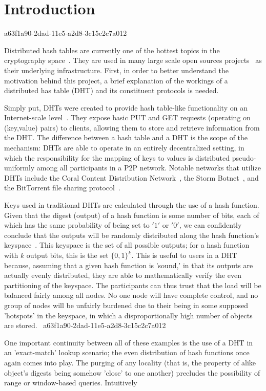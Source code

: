 \documentclass[12pt]{article}
\begin{document}
\section{Introduction}
a63f1a90-2dad-11e5-a2d8-3c15c2c7a012\par Distributed hash tables are currently one of the hottest topics in the cryptography space~\cite{Stoica:2001dj,Rowstron:2001ea,Ratnasamy:2001wn}. They are used in many large scale open sources projects~\cite{Freitas:2013tb,Xu:2010vs,Perfitt:2010fh} as their underlying infrastructure. First, in order to better understand the motivation behind this project, a brief explanation of the workings of a distributed has table (DHT) and its constituent protocols is needed.

\par Simply put, DHTs were created to provide hash table-like functionality on an Internet-scale level~\cite{Ratnasamy:2001wn}. They expose basic PUT and GET requests (operating on (key,value) pairs) to clients, allowing them to store and retrieve information from the DHT. The difference between a hash table and a DHT is the scope of the mechanism: DHTs are able to operate in an entirely decentralized setting, in which the responsibility for the mapping of keys to values is distributed pseudo-uniformly among all participants in a P2P network. Notable networks that utilize DHTs include the Coral Content Distribution Network~\cite{Freedman:2004vb}, the Storm Botnet~\cite{Holz:2008uk}, and the BitTorrent file sharing protocol~\cite{Cohen:y1_8mBnw}.

\par Keys used in traditional DHTs are calculated through the use of a hash function. Given that the digest (output) of a hash function is some number of bits, each of which has the same probability of being set to $'1'$ or $'0'$, we can confidently conclude that the outputs will be randomly distributed along the hash function's keyspace~. This keyspace is the set of all possible outputs; for a hash function with $k$ output bits, this is the set $\{0,1\}^k$. This is useful to users in a DHT because, assuming that a given hash function is 'sound,' in that its outputs are actually evenly distributed, they are able to mathematically verify the even partitioning of the keyspace. The participants can thus trust that the load will be balanced fairly among all nodes. No one node will have complete control, and no group of nodes will be unfairly burdened due to their being in some supposed 'hotspots' in the keyspace, in which a disproportionally high number of objects are stored.~
a63f1a90-2dad-11e5-a2d8-3c15c2c7a012
\par One important continuity between all of these examples is the use of a DHT in an 'exact-match' lookup scenario; the even distribution of hash functions once again comes into play. The purging of any locality (that is, the property of alike object's digests being somehow 'close' to one another) precludes the possibility of range or window-based queries. Intuitively
\end{document}
